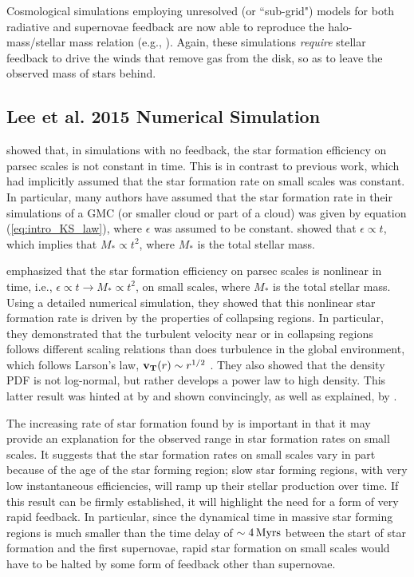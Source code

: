 \documentclass[../dissertation.tex]{subfiles}
\begin{document}
Cosmological simulations employing unresolved (or ``sub-grid") models for both 
radiative and supernovae feedback are now able to reproduce the halo-mass/stellar mass relation (e.g.,
\citealt{2013MNRAS.434.3142A,2014MNRAS.445..581H,2015ApJ...804...18A}). Again, 
these simulations {\em require} 
stellar feedback to drive the winds that remove gas from the disk, so as to leave the observed mass of stars behind. 


\subsection{Lee et al. 2015 Numerical Simulation} \label{Lee15_model}

\citet{2015ApJ...800...49L} showed that, in simulations with no feedback, the star formation efficiency on
parsec scales is not constant in time.
This is in contrast to previous work, which had implicitly assumed that the star formation rate on small scales was constant.
In particular, many authors have assumed that the star formation rate in their simulations of a GMC (or smaller cloud or part of a cloud) was given by equation (\ref{eq:intro_KS_law}), where $\epsilon$ was assumed to be constant.
\citet{2015ApJ...800...49L} showed that $\epsilon \propto t$, which implies that $M_* \propto t^2$, where $M_*$ is the total stellar mass.

\citet{2015ApJ...800...49L} emphasized that the star formation efficiency on 
parsec scales is nonlinear 
in time, i.e., $\epsilon \propto t \rightarrow M_* \propto t^2$, on small scales, where $M_*$ is the total stellar mass. 
Using a detailed numerical simulation, they showed that this nonlinear star formation 
rate is driven by the properties of collapsing regions.
In particular, they demonstrated that the turbulent velocity near or in collapsing regions follows 
different scaling relations than does turbulence in the global environment, which follows
Larson's law, $\mathbf{v_T} (r)\sim r^{1/2}$ \citep{1981MNRAS.194..809L}. 
They also showed that the density PDF 
is not log-normal, but rather develops a power law to high density.
This latter result was hinted at by \citet{2000ApJ...535..869K} and shown convincingly, 
as well as explained, by \citet{2011ApJ...727L..20K}. 

The increasing rate of star formation found by \citet{2015ApJ...800...49L} is important 
in that it may provide an explanation for the observed range in star formation rates on 
small scales.  It suggests that the star formation rates on small scales 
vary in part because of the age of the star forming region; slow star forming 
regions, with very low instantaneous efficiencies, will ramp up their stellar production over time. If this result
can be firmly established, it will highlight the need for a form of very rapid 
feedback. In particular, since the dynamical time in massive star forming regions 
is much smaller than the time delay of $\sim 4{\,\rm Myrs}$ between the start of star 
formation and the first supernovae, rapid star formation on small scales would 
have to be halted by some form of feedback other than supernovae. 
\end{document}
